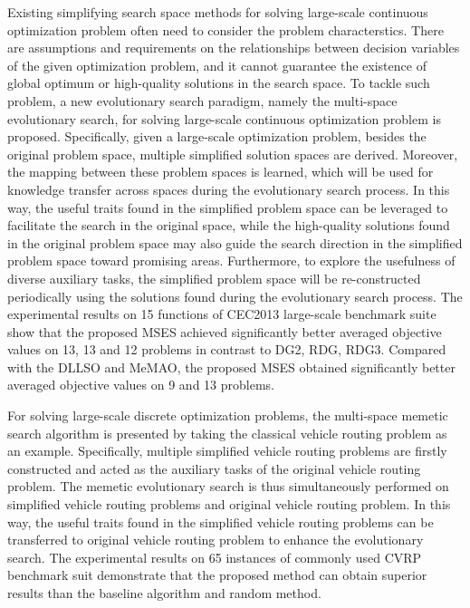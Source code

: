 \begin{eabstract}
 Existing simplifying search space methods for solving large-scale continuous optimization problem often need to consider the problem characterstics. There are assumptions and requirements on the relationships between decision variables of the given optimization problem, and it cannot guarantee the existence of global optimum or high-quality solutions in the search space. To tackle such problem, a new evolutionary search paradigm, namely the multi-space evolutionary search, for solving large-scale continuous optimization problem is proposed. Specifically, given a large-scale optimization problem, besides the original problem space, multiple simplified solution spaces are derived. Moreover, the mapping between these problem spaces is learned, which will be used for knowledge transfer across spaces during the evolutionary search process. In this way, the useful traits found in the simplified problem space can be leveraged to facilitate the search in the original space, while the high-quality solutions found in the original problem space may also guide the search direction in the simplified problem space toward promising areas. Furthermore, to explore the usefulness of diverse auxiliary tasks, the simplified problem space will be re-constructed periodically using the solutions found during the evolutionary search process. The experimental results on 15 functions of CEC2013 large-scale benchmark suite show that the proposed MSES achieved significantly better averaged objective values on 13, 13 and 12 problems in contrast to DG2, RDG, RDG3. Compared with the DLLSO and MeMAO, the proposed MSES obtained significantly better averaged objective values on 9 and 13 problems.

 For solving large-scale discrete optimization problems, the multi-space memetic search algorithm is presented by taking the classical vehicle routing problem as an example. Specifically, multiple simplified vehicle routing problems are firstly constructed and acted as the auxiliary tasks of the original vehicle routing problem. The memetic evolutionary search is thus simultaneously performed on simplified vehicle routing problems and original vehicle routing problem. In this way, the useful traits found in the simplified vehicle routing problems can be transferred to original vehicle routing problem to enhance the evolutionary search. The experimental results on 65 instances of commonly used CVRP benchmark suit demonstrate that the proposed method can obtain superior results than the baseline algorithm and random method.


\end{eabstract}

